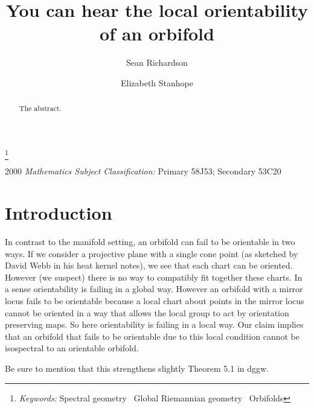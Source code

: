 \documentclass{amsart}
\theoremstyle{plain}
\theoremstyle{definition}
\theoremstyle{remark}
\begin{document}
\title{You can hear the local orientability of an orbifold}

\author[S.Richardson]{Sean Richardson}
\address{Sean Richardson \\ Lewis and Clark College, Department of
Mathematical Sciences, 0615 SW Palatine Hill Road, MSC 110, Portland, OR 97219}
\author[E. Stanhope]{Elizabeth Stanhope}
\address{Elizabeth Stanhope \\ Lewis and Clark College, Department of
Mathematical Sciences, 0615 SW Palatine Hill Road, MSC 110, Portland, OR 97219}
\thanks{{\it Keywords:} Spectral geometry \ Global Riemannian
  geometry \ Orbifolds} 
\maketitle




\begin{abstract}
The abstract.
\end{abstract}

\medskip

\noindent 
\begin{center}
\begin{small}
2000 {\it Mathematics Subject Classification:}
Primary 58J53; Secondary 53C20
\end{small}
\end{center}
\bigskip

\section{Introduction}


In contrast to the manifold setting, an orbifold can fail to be orientable in two ways.  If we consider a projective plane with a single cone point (as sketched by David Webb in his heat kernel notes), we see that each chart can be oriented.  However (we suspect) there is no way to compatibly fit together these charts.  In a sense orientability is failing in a global way.  However an orbifold with a mirror locus fails to be orientable because a local chart about points in the mirror locus cannot be oriented in a way that allows the local group to act by orientation preserving maps.  So here orientability is failing in a local way.  Our claim implies that an orbifold that fails to be orientable due to this local condition cannot be isospectral to an orientable orbifold.

Be sure to mention that this strengthens slightly Theorem 5.1 in dggw.
\end{document}
